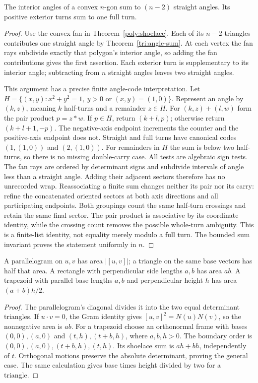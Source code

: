 \begin{theorem}\label{poly:angles}
The interior angles of a convex $n$-gon sum to $(n-2)$ straight angles.
Its positive exterior turns sum to one full turn.
\end{theorem}
\begin{proof}
Use the convex fan in Theorem~\ref{poly:shoelace}. Each of its $n-2$
triangles contributes one straight angle by Theorem~\ref{tri:angle-sum}.
At each vertex the fan rays subdivide exactly that polygon's interior
angle, so adding the fan contributions gives the first assertion. Each
exterior turn is supplementary to its interior angle; subtracting from
$n$ straight angles leaves two straight angles.

This argument has a precise finite angle-code interpretation. Let
$H=\{(x,y):x^2+y^2=1,\ y>0\text{ or }(x,y)=(1,0)\}$.
Represent an angle by $(k,z)$, meaning $k$ half-turns and a remainder
$z\in H$. For $(k,z)+(l,w)$ form the pair product $p=z*w$.
If $p\in H$, return $(k+l,p)$; otherwise return $(k+l+1,-p)$.
The negative-axis endpoint increments the counter and the positive-axis
endpoint does not. Straight and full turns have canonical codes
$(1,(1,0))$ and $(2,(1,0))$. For remainders in $H$ the sum is
below two half-turns, so there is no missing double-carry case.
All tests are algebraic sign tests. The fan rays are ordered
by determinant signs and subdivide intervals of angle less than a
straight angle. Adding their adjacent sectors therefore has no unrecorded
wrap. Reassociating a finite sum changes neither its pair nor its carry:
refine the concatenated oriented sectors at both axis directions and
all participating endpoints. Both groupings count the same half-turn
crossings and retain the same final sector. The pair product is
associative by its coordinate identity, while the crossing count removes
the possible whole-turn ambiguity. This is a finite-list identity,
not equality merely modulo a full turn. The bounded sum invariant proves
the statement uniformly in $n$.
\end{proof}

\begin{theorem}
\label{poly:areas}
A parallelogram on $u,v$ has area $|[u,v]|$; a triangle on the same
base vectors has half that area. A rectangle with perpendicular side
lengths $a,b$ has area $ab$. A trapezoid with parallel base lengths
$a,b$ and perpendicular height $h$ has area $(a+b)h/2$.
\end{theorem}
\begin{proof}
The parallelogram's diagonal divides it into the two equal determinant
triangles. If $u\cdot v=0$, the Gram identity gives
$[u,v]^2=N(u)N(v)$, so the nonnegative area is $ab$.
For a trapezoid choose an orthonormal frame with bases
$(0,0),(a,0)$ and $(t,h),(t+b,h)$, where $a,b,h>0$.
The boundary order is $(0,0),(a,0),(t+b,h),(t,h)$. Its shoelace
sum is $ah+bh$, independently of $t$. Orthogonal motions preserve
the absolute determinant, proving the general case. The same calculation
gives base times height divided by two for a triangle.
\end{proof}

